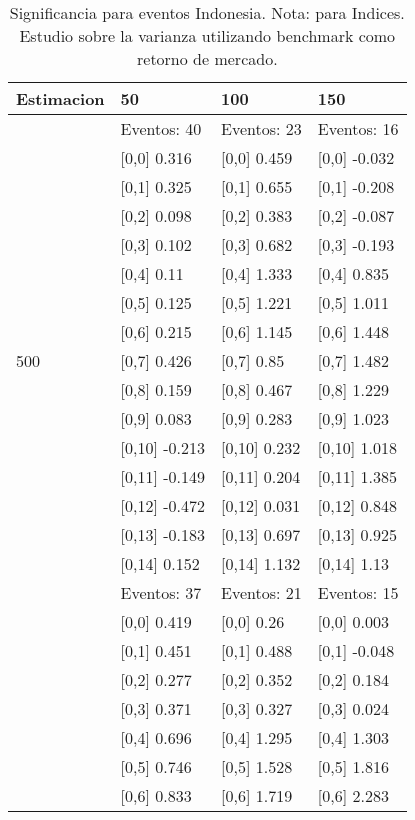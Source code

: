 \begin{table}

\caption{Significancia para eventos Indonesia. Nota: para Indices. Estudio sobre la varianza utilizando benchmark como retorno de mercado.}
\centering
\begin{tabular}[t]{llll}
\toprule
Estimacion & 50 & 100 & 150\\
\midrule
 & Eventos:  40 & Eventos:  23 & Eventos:  16\\
 & {}[0,0] 0.316 & {}[0,0] 0.459 & {}[0,0] -0.032\\
 & {}[0,1] 0.325 & {}[0,1] 0.655 & {}[0,1] -0.208\\
 & {}[0,2] 0.098 & {}[0,2] 0.383 & {}[0,2] -0.087\\
 & {}[0,3] 0.102 & {}[0,3] 0.682 & {}[0,3] -0.193\\
\addlinespace
 & {}[0,4] 0.11 & {}[0,4] 1.333 & {}[0,4] 0.835\\
 & {}[0,5] 0.125 & {}[0,5] 1.221 & {}[0,5] 1.011\\
 & {}[0,6] 0.215 & {}[0,6] 1.145 & {}[0,6] 1.448\\
500 & {}[0,7] 0.426 & {}[0,7] 0.85 & {}[0,7] 1.482\\
 & {}[0,8] 0.159 & {}[0,8] 0.467 & {}[0,8] 1.229\\
\addlinespace
 & {}[0,9] 0.083 & {}[0,9] 0.283 & {}[0,9] 1.023\\
 & {}[0,10] -0.213 & {}[0,10] 0.232 & {}[0,10] 1.018\\
 & {}[0,11] -0.149 & {}[0,11] 0.204 & {}[0,11] 1.385\\
 & {}[0,12] -0.472 & {}[0,12] 0.031 & {}[0,12] 0.848\\
 & {}[0,13] -0.183 & {}[0,13] 0.697 & {}[0,13] 0.925\\
\addlinespace
 & {}[0,14] 0.152 & {}[0,14] 1.132 & {}[0,14] 1.13\\
 & Eventos:  37 & Eventos:  21 & Eventos:  15\\
 & {}[0,0] 0.419 & {}[0,0] 0.26 & {}[0,0] 0.003\\
 & {}[0,1] 0.451 & {}[0,1] 0.488 & {}[0,1] -0.048\\
 & {}[0,2] 0.277 & {}[0,2] 0.352 & {}[0,2] 0.184\\
\addlinespace
 & {}[0,3] 0.371 & {}[0,3] 0.327 & {}[0,3] 0.024\\
 & {}[0,4] 0.696 & {}[0,4] 1.295 & {}[0,4] 1.303\\
 & {}[0,5] 0.746 & {}[0,5] 1.528 & {}[0,5] 1.816\\
 & {}[0,6] 0.833 & {}[0,6] 1.719 & {}[0,6] 2.283\\

\end{tabular}
\end{table}
